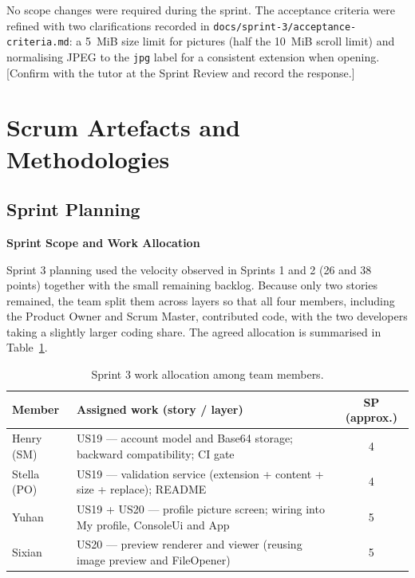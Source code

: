 \documentclass[a4paper,11pt]{article}
\renewcommand{\arraystretch}{1.5}
\begin{document}
No scope changes were required during the sprint. The acceptance criteria were refined with two clarifications recorded in \texttt{docs/sprint-3/acceptance-criteria.md}: a 5~MiB size limit for pictures (half the 10~MiB scroll limit) and normalising JPEG to the \texttt{jpg} label for a consistent extension when opening. [Confirm with the tutor at the Sprint Review and record the response.]

\newpage
\section{Scrum Artefacts and Methodologies}

\subsection{Sprint Planning}

\noindent\textbf{Sprint Scope and Work Allocation}\par
Sprint 3 planning used the velocity observed in Sprints 1 and 2 (26 and 38 points) together with the small remaining backlog. Because only two stories remained, the team split them across layers so that all four members, including the Product Owner and Scrum Master, contributed code, with the two developers taking a slightly larger coding share. The agreed allocation is summarised in Table~\ref{tab:sprint3-allocation}.

\begin{table}[H]
\centering
\small
\renewcommand{\arraystretch}{1.3}
\begin{tabularx}{\textwidth}{|l|X|c|}
\hline
\textbf{Member} & \textbf{Assigned work (story / layer)} & \textbf{SP (approx.)} \\
\hline
Henry (SM) & US19 --- account model and Base64 storage; backward compatibility; CI gate & 4 \\
\hline
Stella (PO) & US19 --- validation service (extension + content + size + replace); README & 4 \\
\hline
Yuhan & US19 + US20 --- profile picture screen; wiring into My profile, ConsoleUi and App & 5 \\
\hline
Sixian & US20 --- preview renderer and viewer (reusing image preview and FileOpener) & 5 \\
\hline
\end{tabularx}
\caption{Sprint 3 work allocation among team members.}
\label{tab:sprint3-allocation}
\end{table}
\end{document}
